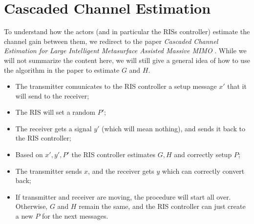 \newpage
\section{Cascaded Channel Estimation}
To understand how the actors (and in particular the RISs controller) estimate the channel gain between them, we redirect to the paper \textit{Cascaded Channel Estimation for Large Intelligent Metasurface Assisted Massive MIMO} \cite{8879620}. While we will not summarize the content here, we will still give a general idea of how to use the algorithm in the paper to estimate $G$ and $H$.
\begin{itemize}
  \item The transmitter comunicates to the RIS controller a setup message $x'$ that it will send to the receiver;
  \item The RIS will set a random $P'$; %
  \item The receiver gets a signal $y'$ (which will mean nothing), and sends it back to the RIS controller;
  \item Based on $x', y', P'$ the RIS controller estimates $G, H$ and correctly setup $P$;
  \item The transmitter sends $x$, and the receiver gets $y$ which can correctly convert back;
  \item If transmitter and receiver are moving, the procedure will start all over. Otherwise, $G$ and $H$ remain the same, and the RIS controller can just create a new $P$ for the next messages.
\end{itemize}
